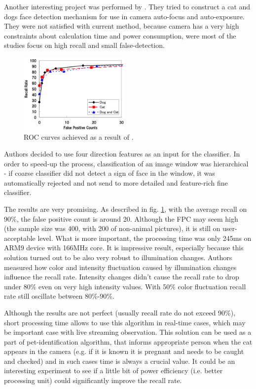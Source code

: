 \documentclass[hyperref]{acmtrans2e}
\begin{document}
Another interesting project was performed by \cite{edges:2011}. They tried to construct a cat and dogs face detection mechanism for use in camera auto-focus and auto-exposure. They were not satisfied with current method, because camera has a very high constraints about calculation time and power consumption, were most of the studies focus on high recall and small false-detection. 
\begin{figure}
\centering
    \includegraphics[width=0.48\textwidth]{roc_edges}
  \caption{ROC curves achieved as a result of \protect\cite{edges:2011}.}
  \label{fig:roc_edges}
\end{figure}
Authors decided to use four direction features as an input for the classifier. In order to speed-up the process, classification of an image window was hierarchical - if coarse classifier did not detect a sign of face in the window, it was automatically rejected and not send to more detailed and feature-rich fine classifier. 

The results are very promising. As described in fig. \ref{fig:roc_edges}, with the average recall on 90\%, the false positive count is around 20. Although the FPC may seem high (the sample size was 400, with 200 of non-animal pictures), it is still on user-acceptable level. What is more important, the processing time was only 245ms on ARM9 device with 166MHz core. It is impressive result, especially because this solution turned out to be also very robust to illumination changes. Authors measured how color and intensity fluctuation caused by illumination changes influence the recall rate. Intensity changes didn't cause the recall rate to drop under 80\% even on very high intensity values. With 50\% color fluctuation recall rate still oscillate between 80\%-90\%. 

Although the results are not perfect (usually recall rate do not exceed 90\%), short processing time allows to use this algorithm in real-time cases, which may be important case with live streaming observation. This solution can be used as a part of pet-identification algorithm, that informs appropriate person when the cat appears in the camera (e.g. if it is known it is pregnant and needs to be caught and checked) and in such cases time is always a crucial value. It could be an interesting experiment to see if a little bit of power efficiency (i.e. better processing unit) could significantly improve the recall rate.
\end{document}

